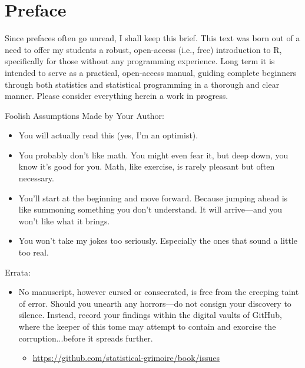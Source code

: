 \chapter*{Preface}
Since prefaces often go unread, I shall keep this brief. This text was born out of a need to offer my students a robust, open-access (i.e., free) introduction to R, specifically for those without any programming experience. Long term it is intended to serve as a practical, open-access manual, guiding complete beginners through both statistics and statistical programming in a thorough and clear manner. Please consider everything herein a work in progress.

\vspace{2em}

{
\headingfont \Large
\noindent Foolish Assumptions Made by Your Author:
\normalsize\normalfont
\begin{itemize}
    \item You will actually read this (yes, I'm an optimist).
    \item You probably don’t like math. You might even fear it, but deep down, you know it’s good for you. Math, like exercise, is rarely pleasant but often necessary.
    \item You’ll start at the beginning and move forward. Because jumping ahead is like summoning something you don’t understand. It will arrive—and you won’t like what it brings.
    \item You won’t take my jokes too seriously. Especially the ones that sound a little too real.
\end{itemize}
}

\vspace{2em}

{
\headingfont \Large
\noindent Errata:
\normalsize\normalfont
\begin{itemize}
\item No manuscript, however cursed or consecrated, is free from the creeping taint of error. Should you unearth any horrors—do not consign your discovery to silence. Instead, record your findings within the digital vaults of GitHub, where the keeper of this tome may attempt to contain and exorcise the corruption...before it spreads further.
    \begin{itemize}
        \item \url{https://github.com/statistical-grimoire/book/issues}
    \end{itemize}
\end{itemize}
}


